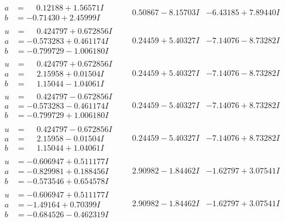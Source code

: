 \documentclass[1p]{elsarticle_modified}
\theoremstyle{definition}
\begin{document}
$$\begin{array}{c|c|c}
\begin{aligned}
a &= \phantom{-}0.12188 + 1.56571 I \\
b &= -0.71430 + 2.45999 I\end{aligned}
 & \phantom{-}0.50867 - 8.15703 I & -6.43185 + 7.89440 I \\ \hline\begin{aligned}
u &= \phantom{-}0.424797 + 0.672856 I \\
a &= -0.573283 + 0.461174 I \\
b &= -0.799729 - 1.006180 I\end{aligned}
 & \phantom{-}0.24459 + 5.40327 I & -7.14076 - 8.73282 I \\ \hline\begin{aligned}
u &= \phantom{-}0.424797 + 0.672856 I \\
a &= \phantom{-}2.15958 + 0.01504 I \\
b &= \phantom{-}1.15044 - 1.04061 I\end{aligned}
 & \phantom{-}0.24459 + 5.40327 I & -7.14076 - 8.73282 I \\ \hline\begin{aligned}
u &= \phantom{-}0.424797 - 0.672856 I \\
a &= -0.573283 - 0.461174 I \\
b &= -0.799729 + 1.006180 I\end{aligned}
 & \phantom{-}0.24459 - 5.40327 I & -7.14076 + 8.73282 I \\ \hline\begin{aligned}
u &= \phantom{-}0.424797 - 0.672856 I \\
a &= \phantom{-}2.15958 - 0.01504 I \\
b &= \phantom{-}1.15044 + 1.04061 I\end{aligned}
 & \phantom{-}0.24459 - 5.40327 I & -7.14076 + 8.73282 I \\ \hline\begin{aligned}
u &= -0.606947 + 0.511177 I \\
a &= -0.829981 + 0.188456 I \\
b &= -0.573546 + 0.654578 I\end{aligned}
 & \phantom{-}2.90982 - 1.84462 I & -1.62797 + 3.07541 I \\ \hline\begin{aligned}
u &= -0.606947 + 0.511177 I \\
a &= -1.49164 + 0.70399 I \\
b &= -0.684526 - 0.462319 I\end{aligned}
 & \phantom{-}2.90982 - 1.84462 I & -1.62797 + 3.07541 I \\ \hline\begin{aligned}

\end{aligned}
\end{array}$$
\end{document}
